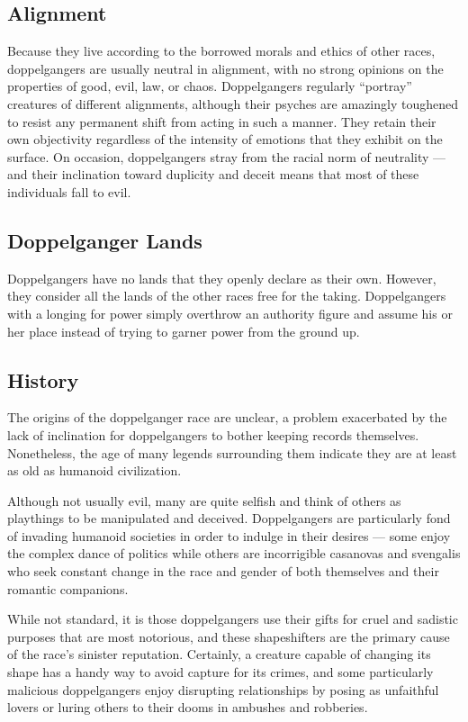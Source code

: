 \subsection{Alignment}
{Because they live according to the borrowed morals and ethics of other races, doppelgangers are usually neutral in alignment, with no strong opinions on the properties of good, evil, law, or chaos. Doppelgangers regularly “portray” creatures of different alignments, although their psyches are amazingly toughened to resist any permanent shift from acting in such a manner. They retain their own objectivity regardless of the intensity of emotions that they exhibit on the surface. On occasion, doppelgangers stray from the racial norm of neutrality — and their inclination toward duplicity and deceit means that most of these individuals fall to evil.}

\subsection{Doppelganger Lands}
{Doppelgangers have no lands that they openly declare as their own. However, they consider all the lands of the other races free for the taking. Doppelgangers with a longing for power simply overthrow an authority figure and assume his or her place instead of trying to garner power from the ground up.}

\subsection{History}
{The origins of the doppelganger race are unclear, a problem exacerbated by the lack of inclination for doppelgangers to bother keeping records themselves. Nonetheless, the age of many legends surrounding them indicate they are at least as old as humanoid civilization.

Although not usually evil, many are quite selfish and think of others as playthings to be manipulated and deceived. Doppelgangers are particularly fond of invading humanoid societies in order to indulge in their desires — some enjoy the complex dance of politics while others are incorrigible casanovas and svengalis who seek constant change in the race and gender of both themselves and their romantic companions.

While not standard, it is those doppelgangers use their gifts for cruel and sadistic purposes that are most notorious, and these shapeshifters are the primary cause of the race's sinister reputation. Certainly, a creature capable of changing its shape has a handy way to avoid capture for its crimes, and some particularly malicious doppelgangers enjoy disrupting relationships by posing as unfaithful lovers or luring others to their dooms in ambushes and robberies.}

